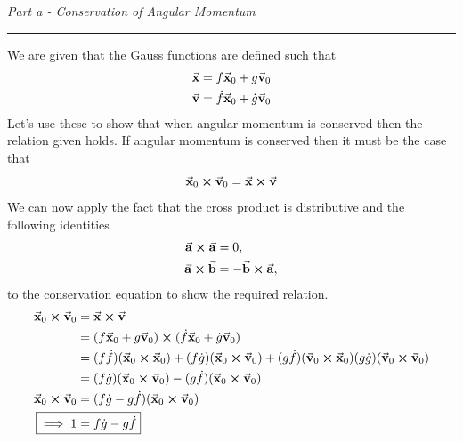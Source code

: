 \documentclass[12pt, letterpaper, twoside]{article}
\newcommand{\question}[1]{{\noindent \it #1}}
\newcommand{\answer}[1]{
    \par\noindent\rule{\textwidth}{0.4pt}#1\vspace{0.5cm}
}
\begin{document}
\question{Part a - Conservation of Angular Momentum}
\answer{
    We are given that the Gauss functions are defined such that
    \begin{align}
        \va{x} &= f \va{x}_0 + g \va{v}_0 \\
        \va{v} &= \dot{f} \va{x}_0 + \dot{g} \va{v}_0
    \end{align}
    Let's use these to show that when angular momentum is conserved then the relation given holds. If angular momentum is conserved then it must be the case that
    \begin{equation}
        \va{x}_0 \cross \va{v}_0 = \va{x} \cross \va{v}
    \end{equation}
    We can now apply the fact that the cross product is distributive and the following identities
    \begin{align}
        \va{a} \cross \va{a} &= 0, \\
        \va{a} \cross \va{b} &= - \va{b} \cross \va{a},
    \end{align}
    to the conservation equation to show the required relation.
    \begin{align}
        \va{x}_0 \cross \va{v}_0 &= \va{x} \cross \va{v} \\
                                 &= \qty(f \va{x}_0 + g \va{v}_0) \cross (\dot{f} \va{x}_0 + \dot{g} \va{v}_0) \\
                                 &= (f \dot{f}) (\va{x}_0 \cross \va{x}_0) + (f \dot{g}) (\va{x}_0 \cross \va{v}_0) + (g \dot{f}) (\va{v}_0 \cross \va{x}_0) (g \dot{g}) (\va{v}_0 \cross \va{v}_0) \\
                                 &= (f \dot{g}) (\va{x}_0 \cross \va{v}_0) - (g \dot{f}) (\va{x}_0 \cross \va{v}_0) \\
        \va{x}_0 \cross \va{v}_0 &= (f \dot{g} - g \dot{f}) (\va{x}_0 \cross \va{v}_0) \\
                               \Aboxed{ \implies 1 &= f \dot{g} - g \dot{f} }
    \end{align}
}
\end{document}
